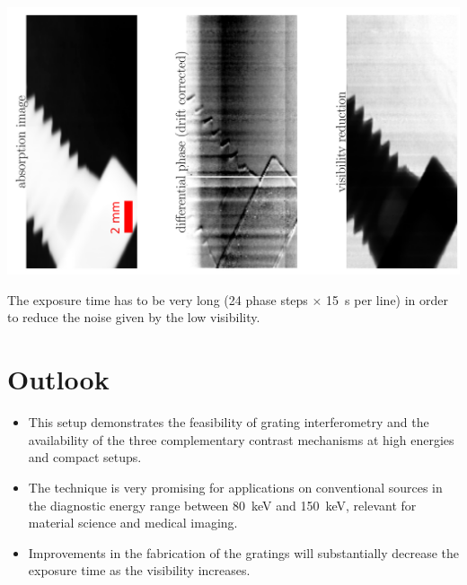 \documentclass[a0,portrait]{a0poster}
\newenvironment{spacedcenter}{
    \vspace{2cm}\begin{center}}
        {\end{center}
    \vspace{2cm}\par}
\begin{document}
\begin{multicols}{2}
\begin{spacedcenter}
    \includegraphics[width=0.8\linewidth]{2013_05_16_screw.pdf}
\end{spacedcenter}
The exposure time has to be very long (\num{24} phase steps $\times$
\SI{15}{\second} per line) in order to reduce the noise given by the low visibility.

\color{Navy} 

\section*{Outlook}

\begin{itemize}
    \item This setup demonstrates the feasibility of grating interferometry
        and the availability of the three complementary contrast mechanisms
        at high energies and compact setups.
    \item The technique is very promising for applications on
        conventional sources in the diagnostic energy range between
        \SI{80}{\kilo\eV} and \SI{150}{\kilo\eV}, relevant for material
        science and medical imaging.
    \item Improvements in the fabrication of the gratings will substantially
        decrease the exposure time as the visibility increases.
\end{itemize}

\color{DarkSlateGray} %



\end{multicols}
\end{document}
